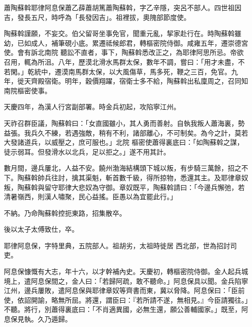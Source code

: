 
\begin{pinyinscope}

 蕭陶蘇斡耶律阿息保蕭乙薛蕭胡篤蕭陶蘇斡，字乙辛隱，突呂不部人。四世祖因吉，發長五尺，時呼為「長發因吉」。祖裡拔，奧隗部節度使。



 陶蘇斡謹願，不妄交。伯父留哥坐事免官，聞重元亂，挈家赴行在。時陶蘇斡雖幼，已如成人，補筆硯小底。累遷祗候郎君，轉樞密院侍御。咸雍五年，遷崇德宮使。會有訴北南院
 聽訟不直者，事下，陶蘇斡悉改正之，為耶律阿思所忌。帝欲召用，輒為所沮。八年，歷漠北滑水馬群太保，數年不調，嘗曰：「用才未盡，不若閑。」乾統中，遷漠南馬群太保，以大風傷草，馬多死，鞭之三百，免官。九年，徙天齊殿宿衛。明年，穀價翔躍，宿衛士多不給，陶蘇斡出私廩周之，召同知南院樞密使事。



 天慶四年，為漢人行宮副部署。時金兵初起，攻陷寧江州。



 天祚召群臣議，陶蘇斡曰：「女直國雖小，其人勇而善射。自執我叛人蕭海裏，勢益張。我兵久不練，若遇強敵，稍有不利，諸部離心，不可制矣。為今之計，莫若大發諸道兵，以威壓之，庶可服也。」北院
 樞密使蕭得裏底曰：「如陶蘇斡之謀，徒示弱耳。但發滑水以北兵，足以拒之。」遂不用其計。



 數月間，邊兵屢北，人益不安。饒州渤海結構頭下城以叛，有步騎三萬餘，招之不下。陶蘇斡帥兵往討，擒其渠魁，斬首數千級，得所掠物，悉還其主。及耶律章奴叛，陶蘇斡與留守耶律大悲奴為守御。章奴既平，陶蘇斡請曰：「今邊兵懈弛，若清暑嶺西，則漢人嘯聚，民心益搖。臣愚以為宜罷此行。」



 不納。乃命陶蘇斡控扼東路，招集散卒。



 後以太子太傅致仕，卒。



 耶律阿息保，字特里典，五院部人。祖胡劣，太祖時徙居
 西北部，世為招討司吏。



 阿息保慷慨有大志，年十六，以才幹補內史。天慶初，轉樞密院侍御。金人起兵城境上，遣阿息保間之，金人曰：「若歸阿疏，敢不聽命。」阿息保具以聞。金兵陷寧江州，邊兵屢敗，遣阿息保與耶律章奴等齊書而東，冀以脅降。阿息保曰：「臣前使，依詔開諭，略無所屈。將還，謂臣曰：『若所請不遂，無相見。』今臣請獨往。」不聽。將行，別蕭得裏底曰：「不肖適異國，必無生還，願公善輔國家。」既至，阿息保見執。久乃遁歸。




\end{pinyinscope}
